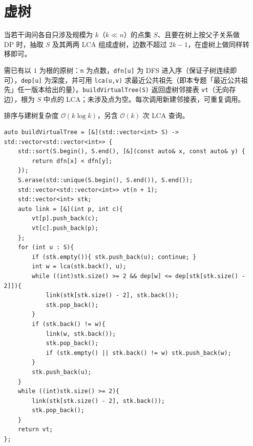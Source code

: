\section{虚树}

当若干询问各自只涉及规模为 $k$（$k\ll n$）的点集 $S$、且要在树上按父子关系做 DP 时，抽取 $S$ 及其两两 LCA 组成虚树，边数不超过 $2k-1$，在虚树上做同样转移即可。

需已有以 $1$ 为根的原树：\texttt{n} 为点数，\texttt{dfn[u]} 为 DFS 进入序（保证子树连续即可），\texttt{dep[u]} 为深度，并可用 \verb|lca(u,v)| 求最近公共祖先（即本专题「最近公共祖先」任一版本给出的量）。\verb|buildVirtualTree(S)| 返回虚树邻接表 \texttt{vt}（无向存边），根为 $S$ 中点的 LCA；未涉及点为空。每次调用新建邻接表，可重复调用。

排序与建树复杂度 $\mathcal{O}(k\log k)$，另含 $\mathcal{O}(k)$ 次 LCA 查询。

\begin{lstlisting}
auto buildVirtualTree = [&](std::vector<int> S) -> std::vector<std::vector<int>> {
    std::sort(S.begin(), S.end(), [&](const auto& x, const auto& y) {
        return dfn[x] < dfn[y];
    });
    S.erase(std::unique(S.begin(), S.end()), S.end());
    std::vector<std::vector<int>> vt(n + 1);
    std::vector<int> stk;
    auto link = [&](int p, int c){
        vt[p].push_back(c);
        vt[c].push_back(p);
    };
    for (int u : S){
        if (stk.empty()){ stk.push_back(u); continue; }
        int w = lca(stk.back(), u);
        while ((int)stk.size() >= 2 && dep[w] <= dep[stk[stk.size() - 2]]){
            link(stk[stk.size() - 2], stk.back());
            stk.pop_back();
        }
        if (stk.back() != w){
            link(w, stk.back());
            stk.pop_back();
            if (stk.empty() || stk.back() != w) stk.push_back(w);
        }
        stk.push_back(u);
    }
    while ((int)stk.size() >= 2){
        link(stk[stk.size() - 2], stk.back());
        stk.pop_back();
    }
    return vt;
};
\end{lstlisting}
